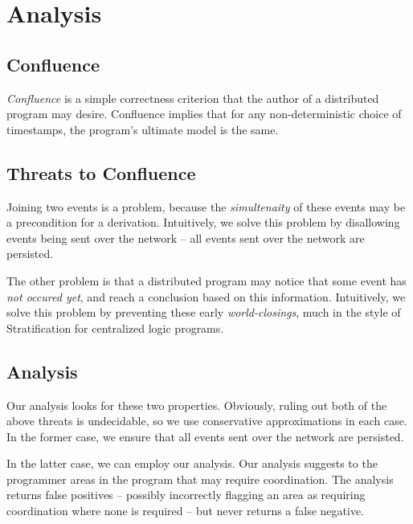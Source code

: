 \section{Analysis}
\label{sec:analysis}

\subsection{Confluence}

{\em Confluence} is a simple correctness criterion that the author of a
distributed program may desire.  Confluence implies that for any
non-deterministic choice of timestamps, the program's ultimate model is the
same.


\subsection{Threats to Confluence}

Joining two events is a problem, because the {\em simultenaity} of these events
may be a precondition for a derivation.  Intuitively, we solve this problem by
disallowing events being sent over the network -- all events sent over the
network are persisted. 

The other problem is that a distributed program may notice that some event has
{\em not occured yet}, and reach a conclusion based on this information.
Intuitively, we solve this problem by preventing these early {\em world-closings},
much in the style of Stratification for centralized logic programs.

\subsection{Analysis}

Our analysis looks for these two properties.  Obviously, ruling out both of the
above threats is undecidable, so we use conservative approximations in each
case.  In the former case, we ensure that all events sent over the network are
persisted.

In the latter case, we can employ our analysis.  Our analysis suggests to the
programmer areas in the program that may require coordination.  The analysis
returns false positives -- possibly incorrectly flagging an area as requiring
coordination where none is required -- but never returns a false negative.

